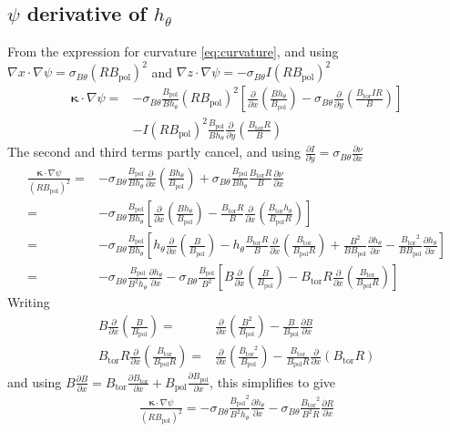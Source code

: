\documentclass[12pt]{article}
\newcommand{\sbt}{\ensuremath{\sigma_{B\theta}}}
\newcommand{\deriv}[2]{\ensuremath{\frac{\partial #1}{\partial #2}}}
\newcommand{\hthe}{\ensuremath{h_\theta}}
\newcommand{\Bp}{\ensuremath{B_{\text{pol}}}}
\newcommand{\Bt}{\ensuremath{B_{\text{tor}}}}
\newcommand{\ve}[1]{\ensuremath{\boldsymbol{#1}}}
\newcommand{\kvec}{\ve{\kappa}}
\newcommand{\rbp}{\ensuremath{R\Bp}}
\newcommand{\rbpsq}{\ensuremath{\left(\rbp\right)^2}}
\begin{document}
\subsection{\texorpdfstring{$\psi$}{psi} derivative of 
            \texorpdfstring{$\hthe$}{h}}
From the expression for curvature \ref{eq:curvature}, and using $\nabla x \cdot
\nabla \psi = \sbt \left(R\Bp\right)^2$ and $\nabla z\cdot\nabla \psi = -\sbt I
\left(R\Bp\right)^2$
%
\begin{align*}
\kvec\cdot\nabla\psi =& -\sbt
\frac{\Bp}{B\hthe}\rbpsq\left[\deriv{}{x}\left(\frac{B\hthe}{\Bp}\right) -
\sbt\deriv{}{y}\left(\frac{\Bt IR}{B}\right)\right] \\
&- I\rbpsq \frac{\Bp}{B\hthe}\deriv{}{y}\left(\frac{\Bt R}{B}\right)
\end{align*}
%
The second and third terms partly cancel, and using $\deriv{I}{y} = \sbt
\deriv{\nu}{x}$
%
\begin{align*}
  \frac{\kvec\cdot\nabla\psi}{\rbpsq} =&
-\sbt\frac{\Bp}{B\hthe}\deriv{}{x}\left(\frac{B\hthe}{\Bp}\right) +
\sbt\frac{\Bp}{B\hthe}\frac{\Bt R}{B}\deriv{\nu}{x} \\
  =& -\sbt\frac{\Bp}{B\hthe}\left[\deriv{}{x}\left(\frac{B\hthe}{\Bp}\right) -
\frac{\Bt R}{B}\deriv{}{x}\left(\frac{\Bt\hthe}{\Bp R}\right)\right] \\
  =& -\sbt\frac{\Bp}{B\hthe}\left[\hthe\deriv{}{x}\left(\frac{B}{\Bp}\right) -
\hthe\frac{\Bt R}{B}\deriv{}{x}\left(\frac{\Bt}{\Bp R}\right) +
\frac{B^2}{B\Bp}\deriv{\hthe}{x} - \frac{\Bt^2}{B\Bp}\deriv{\hthe}{x}\right] \\
  =& -\sbt \frac{\Bp}{B^2\hthe}\deriv{\hthe}{x} -
\sbt\frac{\Bp}{B^2}\left[B\deriv{}{x}\left(\frac{B}{\Bp}\right) - \Bt
R\deriv{}{x}\left(\frac{\Bt}{\Bp R}\right)\right]
\end{align*}
%
Writing
%
\begin{align*}
B\deriv{}{x}\left(\frac{B}{\Bp}\right) =&
\deriv{}{x}\left(\frac{B^2}{\Bp}\right) - \frac{B}{\Bp}\deriv{B}{x} \\
\Bt R\deriv{}{x}\left(\frac{\Bt}{\Bp R}\right) =&
\deriv{}{x}\left(\frac{\Bt^2}{\Bp}\right) - \frac{\Bt}{\Bp
R}\deriv{}{x}\left(\Bt R\right)
\end{align*}
%
and using $B\deriv{B}{x} = \Bt\deriv{\Bt}{x} + \Bp\deriv{\Bp}{x}$, this
simplifies to give
%
\begin{align}
\frac{\kvec\cdot\nabla\psi}{\rbpsq} =
-\sbt\frac{\Bp^2}{B^2\hthe}\deriv{\hthe}{x} - \sbt\frac{\Bt^2}{B^2
R}\deriv{R}{x}
\label{eq:dhdpsi}
\end{align}
%
\end{document}
